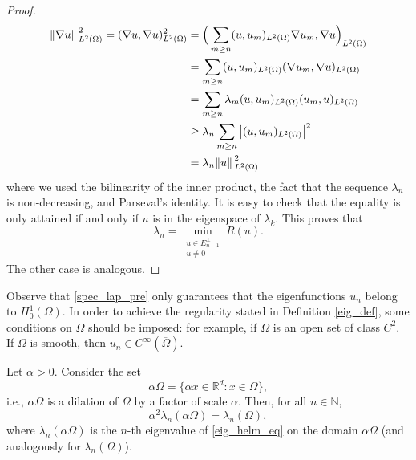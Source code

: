 \begin{proof}
    \begin{align*}
        \norm*{\nabla u}_{L^2(\Omega)}^2 = (\nabla u, \nabla u)_{L^2(\Omega)}^2 &= \Big(\sum_{m\geq n} (u, u_m)_{L^2(\Omega)} \nabla u_m, \nabla u \Big)_{L^2(\Omega)}\\
        &=\sum_{m\geq n} (u, u_m)_{L^2(\Omega)} (\nabla u_m, \nabla u)_{L^2(\Omega)}\\
        &=\sum_{m\geq n} \lambda_m (u, u_m)_{L^2(\Omega)} (u_m, u)_{L^2(\Omega)}\\
        & \geq \lambda_n \sum_{m\geq n} \abs{(u, u_m)_{L^2(\Omega)}}^2\\
        &= \lambda_n \norm*{u}_{L^2(\Omega)}^2
    \end{align*}
    where we used the bilinearity of the inner product, the fact that the sequence \(\lambda_n\) is non-decreasing, and Parseval's identity. It is easy to check that the equality is only attained if and only if \(u\) is in the eigenspace of \(\lambda_k\). This proves that
    \[
        \lambda_n = \min_{\substack{u \in E^\perp_{n-1} \\ u \neq 0}} R(u). 
    \]
    The other case is analogous.
\end{proof}
\begin{remark}
    Observe that \eqref{spec_lap_pre} only guarantees that the eigenfunctions \(u_n\) belong to \(H^1_0(\Omega)\). In order to achieve the regularity stated in Definition \eqref{eig_def}, some conditions on \(\Omega\) should be imposed: for example, if \(\Omega\) is an open set of class \(C^2\). If \(\Omega\) is smooth, then \(u_n \in C^\infty(\overline{\Omega})\).
\end{remark}

\begin{corollary}[Homogeneity]\label{lap_homo}
    Let \(\alpha > 0\). Consider the set
    \[
        \alpha \Omega = \{\alpha x \in \mathbb{R}^d: x \in \Omega\},
    \]
    i.e., \(\alpha \Omega\) is a dilation of \(\Omega\) by a factor of scale \(\alpha\).  
    Then, for all \(n \in \mathbb{N}\),
    \[
        \alpha^2 \lambda_n(\alpha \Omega) = \lambda_n(\Omega),
    \]
    where \(\lambda_n(\alpha \Omega)\) is the \(n\)-th eigenvalue of \eqref{eig_helm_eq} on the domain \(\alpha \Omega\) (and analogously for \(\lambda_n(\Omega)\)).
\end{corollary}

